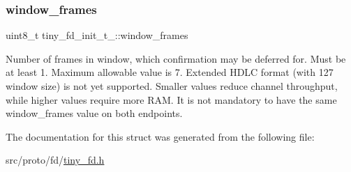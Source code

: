 \subsubsection{\texorpdfstring{window\+\_\+frames}{window\_frames}}
{\footnotesize\ttfamily uint8\+\_\+t tiny\+\_\+fd\+\_\+init\+\_\+t\+\_\+\+::window\+\_\+frames}

Number of frames in window, which confirmation may be deferred for. Must be at least 1. Maximum allowable value is 7. Extended H\+D\+LC format (with 127 window size) is not yet supported. Smaller values reduce channel throughput, while higher values require more R\+AM. It is not mandatory to have the same window\+\_\+frames value on both endpoints. 

The documentation for this struct was generated from the following file\+:\begin{DoxyCompactItemize}
\item 
src/proto/fd/\hyperlink{tiny__fd_8h}{tiny\+\_\+fd.\+h}\end{DoxyCompactItemize}
